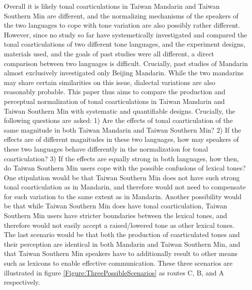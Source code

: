 \documentclass[12pt]{report}
\begin{document}
\begin{CJK}{UTF8}{bsmi}
Overall it is likely tonal coarticulations in Taiwan Mandarin and Taiwan Southern Min are different, and the normalizing mechanisms of the speakers of the two languages to cope with tone variation are also possibly rather different. However, since no study so far have systemetically investigated and compared the tonal coarticulations of two different tone languages, and the experiment designs, materials used, and the goals of past studies were all different, a direct comparison between two languages is difficult. Crucially, past studies of Mandarin almost exclusively investigated only Beijing Mandarin. While the two mandarins may share certain similarities on this issue, dialectal variations are also reasonably probable. This paper thus aims to compare the production and perceptual normalization of tonal coarticulations in Taiwan Mandarin and Taiwan Southern Min with systematic and quantifiable designs. Crucially, the following questions are asked: 1) Are the effects of tonal coarticulation of the same magnitude in both Taiwan Mandarin and Taiwan Southern Min? 2) If the effects are of different magnitudes in these two languages, how may speakers of these two languages behave differently in the normalization for tonal coarticulation? 3) If the effects are equally strong in both languages, how then, do Taiwan Southern Min users cope with the possible confusions of lexical tones? One stipulation would be that Taiwan Southern Min does not have such strong tonal coarticulation as in Mandarin, and therefore would not need to compensate for such variation to the same extent as in Mandarin. Another possibility would be that while Taiwan Southern Min does have tonal coarticulation, Taiwan Southern Min users have stricter boundaries between the lexical tones, and therefore would not easily accept a raised/lowered tone as other lexical tones. The last scenario would be that both the production of coarticulated tones and their perception are identical in both Mandarin and Taiwan Southern Min, and that Taiwan Southern Min speakers have to additionally result to other means such as lexicons to enable effective communication. These three scenarios are illustrated in figure \ref{Figure:ThreePossibleScenarios} as routes C, B, and A respectively.
\begin{figure}[hbt!]
\centering
{}
\end{figure}
\end{CJK}
\end{document}
